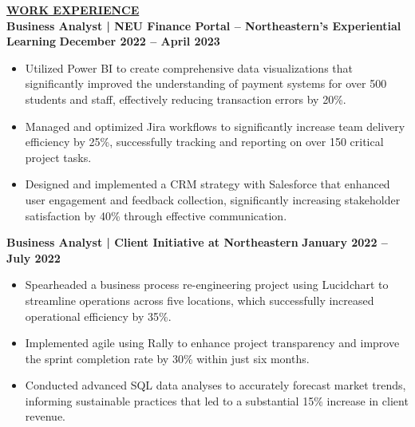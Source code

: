 \documentclass{article}
\begin{document}
\vspace{2mm}
\noindent \textbf{\underline{WORK EXPERIENCE}} \\
\noindent \textbf{Business Analyst | NEU Finance Portal – Northeastern's Experiential Learning} \hfill \textbf{December 2022 – April 2023}
\begin{itemize}[noitemsep,nolistsep,leftmargin=*]
\item {\small Utilized Power BI to create comprehensive data visualizations that significantly improved the understanding of payment systems for over 500 students and staff, effectively reducing transaction errors by 20\%.}
\item {\small Managed and optimized Jira workflows to significantly increase team delivery efficiency by 25\%, successfully tracking and reporting on over 150 critical project tasks.}
\item {\small Designed and implemented a CRM strategy with Salesforce that enhanced user engagement and feedback collection, significantly increasing stakeholder satisfaction by 40\% through effective communication.}
\end{itemize}
\vspace{1mm}

\noindent \textbf{Business Analyst | Client Initiative at Northeastern} \hfill \textbf{January 2022 – July 2022}
\begin{itemize}[noitemsep,nolistsep,leftmargin=*]
\item {\small Spearheaded a business process re-engineering project using Lucidchart to streamline operations across five locations, which successfully increased operational efficiency by 35\%.}
\item {\small Implemented agile using Rally to enhance project transparency and improve the sprint completion rate by 30\% within just six months.}
\item {\small Conducted advanced SQL data analyses to accurately forecast market trends, informing sustainable practices that led to a substantial 15\% increase in client revenue.}
\end{itemize}
\vspace{1mm}
\end{document}

